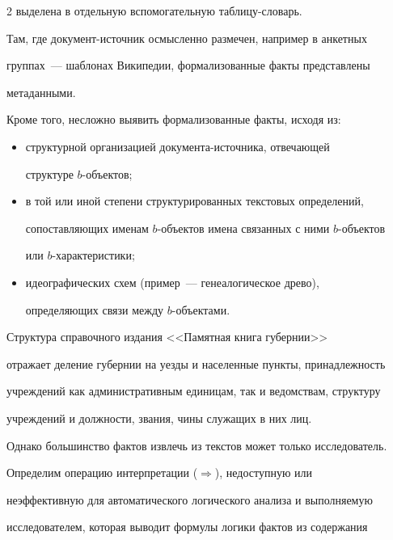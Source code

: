 \begin{multicols}{2}
выделена в отдельную вспомогательную таб\-ли\-цу-сло\-варь. 


  


  Там, где документ-источник осмысленно размечен, например в анкетных 


группах~--- шаблонах Википедии, формализованные факты представлены 


метаданными. 


  


  Кроме того, несложно выявить формализованные факты, исходя из:


  \begin{itemize}


\item структурной организацией документа-ис\-точ\-ни\-ка, отвечающей 


структуре $b$-объектов;


\item в той или иной степени структурированных текстовых определений, 


сопоставляющих именам $b$-объектов имена связанных с ними $b$-объек\-тов 


или $b$-характеристики;


\item идеографических схем (пример~--- генеалогическое древо), 


определяющих связи между $b$-объ\-ек\-тами.


\end{itemize}





  Структура справочного издания <<Памятная книга губернии>>~\cite{16mar} 


отражает деление губернии на уезды и населенные пункты, принадлежность 


учреждений как административным единицам, так и ведомствам, структуру 


учреждений и должности, звания, чины служащих в них лиц. 


  


  Однако большинство фактов извлечь из текстов может только исследователь. 


Определим операцию интерпретации ($\Rightarrow$), недоступную или 


неэффективную для автоматического логического анализа и выполняемую 


исследователем, которая выводит формулы логики фактов из содержания 



\end{multicols}
